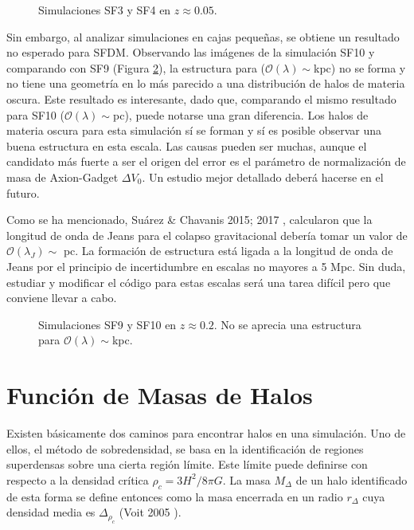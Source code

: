 \documentclass[a4paper,openright,10pt, oneside, final]{book}
\begin{document}
\begin{figure}
\centering
{}
\caption{\footnotesize{Simulaciones SF3 y SF4 en $z\approx0.05$. }}\label{Fig 4.8}
\end{figure}
Sin embargo, al analizar simulaciones en cajas pequeñas, se obtiene un resultado no esperado para SFDM. Observando las imágenes de la simulación SF10 y comparando con SF9 (Figura \ref{Fig 4.9}), la estructura para ($\mathcal{O}(\lambda)\sim$kpc) no se forma y no tiene una geometría en lo más parecido a una distribución de halos de materia oscura. Este resultado es interesante, dado que, comparando el mismo resultado para SF10 ($\mathcal{O}(\lambda)\sim$pc), puede notarse una gran diferencia. Los halos de materia oscura para esta simulación sí se forman y sí es posible observar una buena estructura en esta escala. Las causas pueden ser muchas, aunque el candidato más fuerte a ser el origen del error es el parámetro de normalización de masa de Axion-Gadget $\Delta V_{0}$. Un estudio mejor detallado deberá hacerse en el futuro.

Como se ha mencionado, Suárez \& Chavanis 2015; 2017 \cite{4.3.6, 4.3.7}, calcularon que la longitud de onda de Jeans para el colapso gravitacional debería tomar un valor de $\mathcal{O}(\lambda_{J})\sim$ pc. La formación de estructura está ligada a la longitud de onda de Jeans por el principio de incertidumbre en escalas no mayores a 5 Mpc. Sin duda, estudiar y modificar el código para estas escalas será una tarea difícil pero que conviene llevar a cabo.



\begin{figure}
\centering
{}
\caption{\footnotesize{Simulaciones SF9 y SF10 en $z\approx0.2$. No se aprecia una estructura para $\mathcal{O}(\lambda)\sim$kpc.}}\label{Fig 4.9}
\end{figure}


\section{Función de Masas de Halos }
Existen básicamente dos caminos para encontrar halos en una simulación. Uno de ellos, el método de sobredensidad, se basa en la identificación de regiones superdensas sobre una cierta región límite. Este límite puede definirse con respecto a la densidad crítica $\rho_{c} = 3H^{2}/ 8\pi G$. La masa $M_{\Delta}$ de un halo identificado de esta forma se define entonces como la masa encerrada en un radio $r_{\Delta}$ cuya densidad media es $\Delta_{\rho_{c}}$ (Voit 2005 \cite{4.4.1}).
\end{document}
